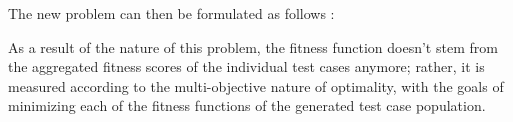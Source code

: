 The new problem can then be formulated as follows \cite{DBLP:journals/tse/PanichellaKT18}:

As a result of the nature of this problem, the fitness function doesn't stem from the aggregated fitness scores of the individual test cases anymore; rather, it is measured according to the multi-objective nature of optimality, with the goals of minimizing each of the fitness functions of the generated test case population.



